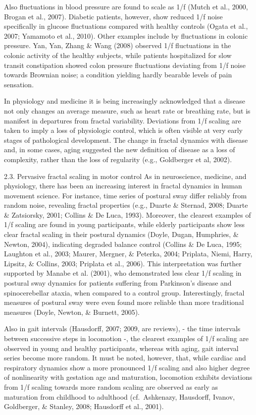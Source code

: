\documentclass[12pt,]{book}
\begin{document}
Also fluctuations in blood pressure are found to scale as 1/f (Mutch et al., 2000, Brogan et al., 2007). Diabetic patients, however, show reduced 1/f noise specifically in glucose fluctuations compared with healthy controls (Ogata et al., 2007; Yamamoto et al., 2010). Other examples include by fluctuations in colonic pressure. Yan, Yan, Zhang \& Wang (2008) observed 1/f fluctuations in the colonic activity of the healthy subjects, while patients hospitalized for slow transit constipation showed colon pressure fluctuations deviating from 1/f noise towards Brownian noise; a condition yielding hardly bearable levels of pain sensation.

In physiology and medicine it is being increasingly acknowledged that a disease not only changes an average measure, such as heart rate or breathing rate, but is manifest in departures from fractal variability. Deviations from 1/f scaling are taken to imply a loss of physiologic control, which is often visible at very early stages of pathological development. The change in fractal dynamics with disease and, in some cases, aging suggested the new definition of disease as a loss of complexity, rather than the loss of regularity (e.g., Goldberger et al, 2002).

2.3. Pervasive fractal scaling in motor control
As in neuroscience, medicine, and physiology, there has been an increasing interest in fractal dynamics in human movement science. For instance, time series of postural sway differ reliably from random noise, revealing fractal properties (e.g., Duarte \& Sternad, 2008; Duarte \& Zatsiorsky, 2001; Collins \& De Luca, 1993). Moreover, the clearest examples of 1/f scaling are found in young participants, while elderly participants show less clear fractal scaling in their postural dynamics (Doyle, Dugan, Humphries, \& Newton, 2004), indicating degraded balance control (Collins \& De Luca, 1995; Laughton et al., 2003; Maurer, Mergner, \& Peterka, 2004; Priplata, Niemi, Harry, Lipsitz, \& Collins, 2003; Priplata et al., 2006). This interpretation was further supported by Manabe et al. (2001), who demonstrated less clear 1/f scaling in postural sway dynamics for patients suffering from Parkinson's disease and spinocerebellar ataxia, when compared to a control group. Interestingly, fractal measures of postural sway were even found more reliable than more traditional measures (Doyle, Newton, \& Burnett, 2005).

Also in gait intervals (Hausdorff, 2007; 2009, are reviews), - the time intervals between successive steps in locomotion -, the clearest examples of 1/f scaling are observed in young and healthy participants, whereas with aging, gait interval series become more random. It must be noted, however, that, while cardiac and respiratory dynamics show a more pronounced 1/f scaling and also higher degree of nonlinearity with gestation age and maturation, locomotion exhibits deviations from 1/f scaling towards more random scaling are observed as early as maturation from childhood to adulthood (cf.~Ashkenazy, Hausdorff, Ivanov, Goldberger, \& Stanley, 2008; Hausdorff et al., 2001).
\end{document}
